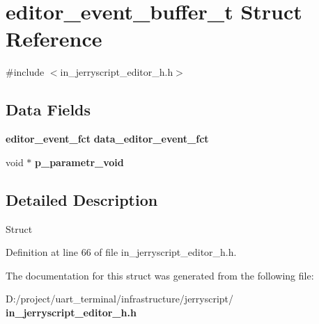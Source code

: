 \section{editor\+\_\+event\+\_\+buffer\+\_\+t Struct Reference}
\label{structeditor__event__buffer__t}


{\ttfamily \#include $<$in\+\_\+jerryscript\+\_\+editor\+\_\+h.\+h$>$}

\subsection*{Data Fields}
\begin{DoxyCompactItemize}
\item 
\mbox{\label{structeditor__event__buffer__t_a24bfc31c8aa271aecda863164dda74e7}} 
\textbf{ editor\+\_\+event\+\_\+fct} {\bfseries data\+\_\+editor\+\_\+event\+\_\+fct}
\item 
\mbox{\label{structeditor__event__buffer__t_af752e0be0d8ca292d637313bada33817}} 
void $\ast$ {\bfseries p\+\_\+parametr\+\_\+void}
\end{DoxyCompactItemize}


\subsection{Detailed Description}
Struct 

Definition at line 66 of file in\+\_\+jerryscript\+\_\+editor\+\_\+h.\+h.



The documentation for this struct was generated from the following file\+:\begin{DoxyCompactItemize}
\item 
D\+:/project/uart\+\_\+terminal/infrastructure/jerryscript/\textbf{ in\+\_\+jerryscript\+\_\+editor\+\_\+h.\+h}\end{DoxyCompactItemize}
